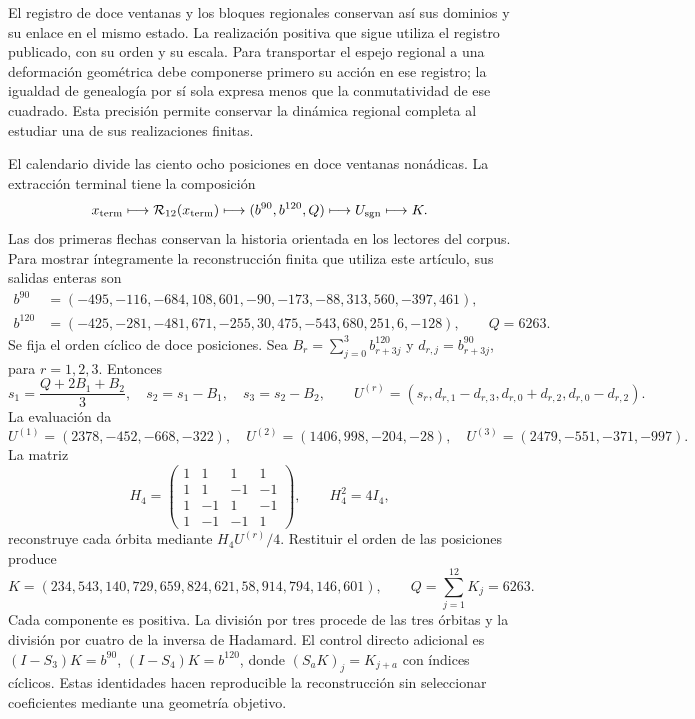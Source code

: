 \documentclass[a4paper,10pt]{article}
\theoremstyle{definition}\newtheorem{definition}[theorem]{Definición}
\theoremstyle{remark}\newtheorem{remark}[theorem]{Observación}
\numberwithin{equation}{section}
\begin{document}
El registro de doce ventanas y los bloques regionales conservan así
sus dominios y su enlace en el mismo estado. La realización positiva
que sigue utiliza el registro publicado, con su orden y su escala.
Para transportar el espejo regional a una deformación geométrica debe
componerse primero su acción en ese registro; la igualdad de genealogía
por sí sola expresa menos que la conmutatividad de ese cuadrado. Esta
precisión permite conservar la dinámica regional completa al estudiar
una de sus realizaciones finitas.

El calendario divide las ciento ocho posiciones en doce ventanas nonádicas.
La extracción terminal tiene la composición
\[
 x_{\rm term}\longmapsto\mathcal R_{12}(x_{\rm term})
 \longmapsto(b^{90},b^{120},Q)\longmapsto U_{\rm sgn}\longmapsto K.
\]
Las dos primeras flechas conservan la historia orientada en los lectores
del corpus. Para mostrar íntegramente la reconstrucción finita que utiliza
este artículo, sus salidas enteras son
\begin{align*}
 b^{90}&=(-495,-116,-684,108,601,-90,-173,-88,313,560,-397,461),\\
 b^{120}&=(-425,-281,-481,671,-255,30,475,-543,680,251,6,-128),
 \qquad Q=6263.
\end{align*}
Se fija el orden cíclico de doce posiciones. Sea
\(B_r=\sum_{j=0}^3 b^{120}_{r+3j}\) y
\(d_{r,j}=b^{90}_{r+3j}\), para \(r=1,2,3\). Entonces
\[
 s_1=\frac{Q+2B_1+B_2}{3},\quad s_2=s_1-B_1,\quad s_3=s_2-B_2,
 \qquad
 U^{(r)}=(s_r,d_{r,1}-d_{r,3},d_{r,0}+d_{r,2},d_{r,0}-d_{r,2}).
\]
La evaluación da
\[
 U^{(1)}=(2378,-452,-668,-322),\quad
 U^{(2)}=(1406,998,-204,-28),\quad
 U^{(3)}=(2479,-551,-371,-997).
\]
La matriz
\[
 H_4=\begin{pmatrix}1&1&1&1\\1&1&-1&-1\\1&-1&1&-1\\1&-1&-1&1\end{pmatrix},
 \qquad H_4^2=4I_4,
\]
reconstruye cada órbita mediante \(H_4U^{(r)}/4\). Restituir el orden
de las posiciones produce
\begin{equation}
 K=(234,543,140,729,659,824,621,58,914,794,146,601),
 \qquad Q=\sum_{j=1}^{12}K_j=6263.
 \label{eq:K-main}
\end{equation}
Cada componente es positiva. La división por tres procede de las tres
órbitas y la división por cuatro de la inversa de Hadamard. El control
directo adicional es \((I-S_3)K=b^{90}\),
\((I-S_4)K=b^{120}\), donde \((S_aK)_j=K_{j+a}\) con índices cíclicos.
Estas identidades hacen reproducible la reconstrucción sin seleccionar
coeficientes mediante una geometría objetivo.
\end{document}
